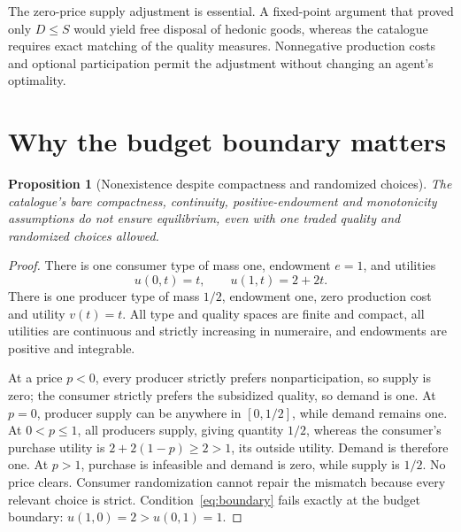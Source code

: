 \documentclass[11pt,a4paper]{article}
\newtheorem{proposition}[theorem]{Proposition}
\theoremstyle{definition}
\theoremstyle{remark}
\begin{document}
The zero-price supply adjustment is essential. A fixed-point argument that proved only $D\leq S$ would yield free disposal of hedonic goods, whereas the catalogue requires exact matching of the quality measures. Nonnegative production costs and optional participation permit the adjustment without changing an agent's optimality.

\section{Why the budget boundary matters}
\begin{proposition}[Nonexistence despite compactness and randomized choices]\label{pr:failure}
The catalogue's bare compactness, continuity, positive-endowment and monotonicity assumptions do not ensure equilibrium, even with one traded quality and randomized choices allowed.
\end{proposition}
\begin{proof}
There is one consumer type of mass one, endowment $e=1$, and utilities
\[
 u(0,t)=t,\qquad u(1,t)=2+2t.
\]
There is one producer type of mass $1/2$, endowment one, zero production cost and utility $v(t)=t$. All type and quality spaces are finite and compact, all utilities are continuous and strictly increasing in numeraire, and endowments are positive and integrable.

At a price $p<0$, every producer strictly prefers nonparticipation, so supply is zero; the consumer strictly prefers the subsidized quality, so demand is one. At $p=0$, producer supply can be anywhere in $[0,1/2]$, while demand remains one. At $0<p\leq1$, all producers supply, giving quantity $1/2$, whereas the consumer's purchase utility is $2+2(1-p)\geq2>1$, its outside utility. Demand is therefore one. At $p>1$, purchase is infeasible and demand is zero, while supply is $1/2$. No price clears. Consumer randomization cannot repair the mismatch because every relevant choice is strict. Condition~\eqref{eq:boundary} fails exactly at the budget boundary: $u(1,0)=2>u(0,1)=1$.
\end{proof}
\end{document}
